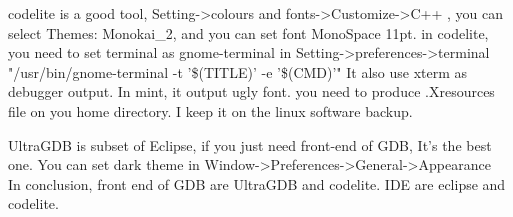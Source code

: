 \documentclass[a4paper,11pt,twoside]{book}
\begin{document}
codelite is a good tool, Setting->colours and fonts->Customize->C++ , you can select Themes: Monokai\_2, and you can set font MonoSpace 11pt.  
in codelite, you need to set terminal as gnome-terminal in Setting->preferences->terminal "/usr/bin/gnome-terminal -t '\$(TITLE)' -e '\$(CMD)'"
It also use xterm as debugger output. In mint, it output ugly font.  you need to produce .Xresources file on you home directory.  I keep it on the linux software backup. 

UltraGDB is subset of Eclipse, if you just need front-end of GDB, It's the best one. You can set dark theme in Window->Preferences->General->Appearance \\

In conclusion,  front end of GDB are UltraGDB and codelite. IDE are eclipse and codelite.
\end{document}
